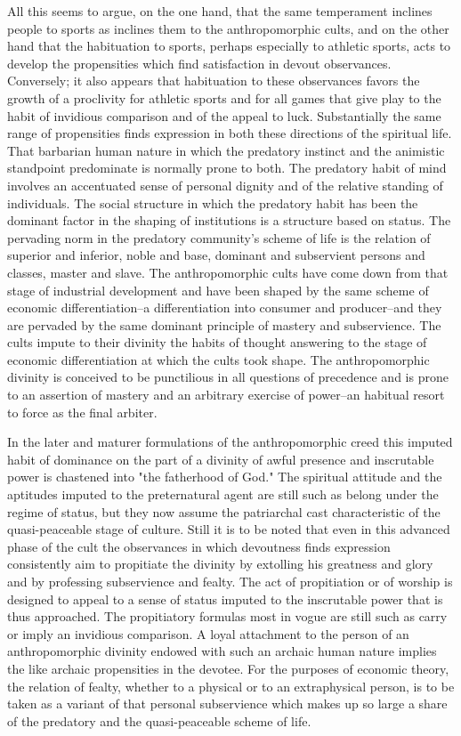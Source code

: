 \documentclass[12pt]{report}
\begin{document}
All this seems to argue, on the one hand, that the same temperament
inclines people to sports as inclines them to the anthropomorphic cults,
and on the other hand that the habituation to sports, perhaps especially
to athletic sports, acts to develop the propensities which find
satisfaction in devout observances. Conversely; it also appears that
habituation to these observances favors the growth of a proclivity
for athletic sports and for all games that give play to the habit of
invidious comparison and of the appeal to luck. Substantially the same
range of propensities finds expression in both these directions of
the spiritual life. That barbarian human nature in which the predatory
instinct and the animistic standpoint predominate is normally prone
to both. The predatory habit of mind involves an accentuated sense of
personal dignity and of the relative standing of individuals. The social
structure in which the predatory habit has been the dominant factor
in the shaping of institutions is a structure based on status. The
pervading norm in the predatory community's scheme of life is the
relation of superior and inferior, noble and base, dominant and
subservient persons and classes, master and slave. The anthropomorphic
cults have come down from that stage of industrial development and
have been shaped by the same scheme of economic differentiation--a
differentiation into consumer and producer--and they are pervaded by the
same dominant principle of mastery and subservience. The cults impute to
their divinity the habits of thought answering to the stage of economic
differentiation at which the cults took shape. The anthropomorphic
divinity is conceived to be punctilious in all questions of precedence
and is prone to an assertion of mastery and an arbitrary exercise of
power--an habitual resort to force as the final arbiter.

In the later and maturer formulations of the anthropomorphic creed this
imputed habit of dominance on the part of a divinity of awful presence
and inscrutable power is chastened into "the fatherhood of God." The
spiritual attitude and the aptitudes imputed to the preternatural agent
are still such as belong under the regime of status, but they now assume
the patriarchal cast characteristic of the quasi-peaceable stage of
culture. Still it is to be noted that even in this advanced phase of the
cult the observances in which devoutness finds expression consistently
aim to propitiate the divinity by extolling his greatness and glory and
by professing subservience and fealty. The act of propitiation or
of worship is designed to appeal to a sense of status imputed to the
inscrutable power that is thus approached. The propitiatory formulas
most in vogue are still such as carry or imply an invidious comparison.
A loyal attachment to the person of an anthropomorphic divinity endowed
with such an archaic human nature implies the like archaic propensities
in the devotee. For the purposes of economic theory, the relation of
fealty, whether to a physical or to an extraphysical person, is to be
taken as a variant of that personal subservience which makes up so large
a share of the predatory and the quasi-peaceable scheme of life.
\end{document}
